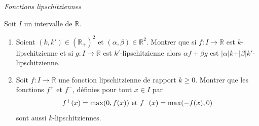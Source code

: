 \documentclass[a4paper,10pt]{report}
\begin{document}
\bigskip

\begin{center}
\textit{{ {\large Fonctions lipschitziennes}}}
\end{center}

\medskip


\begin{Exercice}{} Soit $I$ un intervalle de $\mathbb{R}$.

\begin{enumerate}
\item Soient $(k,k') \in (\mathbb{R}_+)^2$ et $(\alpha, \beta) \in \mathbb{R}^2$. Montrer que si $f : I \rightarrow \mathbb{R}$ est $k$-lipschitzienne et si $g : I \rightarrow \mathbb{R}$ est $k'$-lipschitzienne alors $\alpha f+ \beta g$ est $\vert \alpha \vert k  + \vert \beta \vert k'$-lipschitzienne.
\item Soit $f : I \rightarrow \mathbb{R}$ une fonction lipschitzienne de rapport $k \geq 0$. Montrer que les fonctions $f^+$ et $f^{-}$, définies pour tout $x \in I$ par 
$$ f^+(x)= \max(0,f(x)) \hbox{ et } f^{-}(x) = \max(-f(x),0) $$
sont aussi $k$-lipschitziennes.
\end{enumerate}
\end{Exercice}

\corr 
\end{document}
